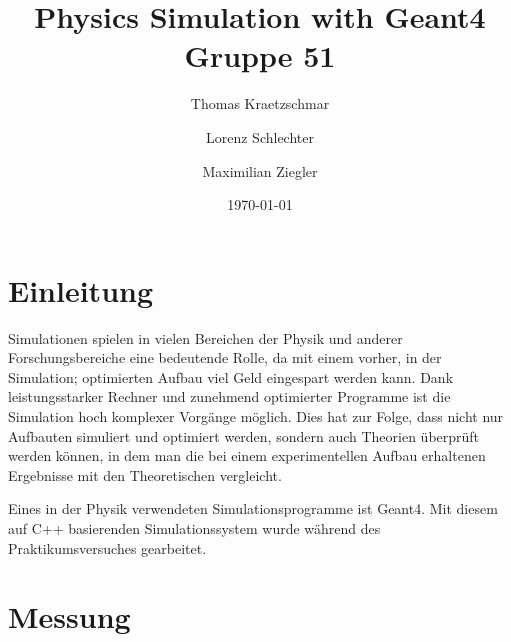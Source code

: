 \documentclass[a4paper,14pt,twoside]{article}
\title{%
{\Huge Physics Simulation with Geant4}\\[0.5\baselineskip]
{\normalsize Gruppe 51}
}
\author{%
Thomas Kraetzschmar
\and Lorenz Schlechter
\and Maximilian Ziegler
}
\date{\today}
\begin{document}
\pagestyle{fancy}
\maketitle
\clearpage
\tableofcontents
\clearpage
\pagestyle{fancy}
\section{Einleitung}
Simulationen spielen in vielen Bereichen der Physik und anderer Forschungsbereiche eine bedeutende Rolle, da mit einem vorher, in der Simulation; optimierten Aufbau viel Geld eingespart werden kann. Dank leistungsstarker Rechner und zunehmend optimierter Programme ist die Simulation hoch komplexer Vorgänge möglich. Dies hat zur Folge, dass nicht nur Aufbauten simuliert und optimiert werden, sondern auch Theorien überprüft werden können, in dem man die bei einem experimentellen Aufbau erhaltenen Ergebnisse mit den Theoretischen vergleicht.

Eines in der Physik verwendeten Simulationsprogramme ist Geant4. Mit diesem auf C++ basierenden Simulationssystem wurde während des Praktikumsversuches gearbeitet.


\section{Messung}
\end{document}
